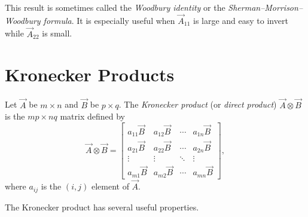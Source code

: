 This result is sometimes called the \emph{Woodbury identity} or the
\emph{Sherman--Morrison--Woodbury formula}.  It is especially useful
when $\vec{A}_{11}$ is large and easy to invert while
$\vec{A}_{22}$ is small.

\section{Kronecker Products}
\label{sec:A.3}

\begin{definition}
\label{def:kronecker}
Let $\vec{A}$ be $m \times n$ and $\vec{B}$ be $p \times q$.
The \emph{Kronecker product} (or \emph{direct product})
$\vec{A} \otimes \vec{B}$ is the $mp \times nq$ matrix defined by
\begin{equation}
  \vec{A} \otimes \vec{B}
  =
  \begin{bmatrix}
    a_{11}\vec{B} & a_{12}\vec{B} & \cdots & a_{1n}\vec{B} \\
    a_{21}\vec{B} & a_{22}\vec{B} & \cdots & a_{2n}\vec{B} \\
    \vdots & \vdots & \ddots & \vdots \\
    a_{m1}\vec{B} & a_{m2}\vec{B} & \cdots & a_{mn}\vec{B}
  \end{bmatrix},
  \label{eq:A.12}
\end{equation}
where $a_{ij}$ is the $(i,j)$ element of $\vec{A}$.
\end{definition}

The Kronecker product has several useful properties.

